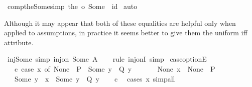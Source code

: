 \begin{isabellebody}
{\isafoldproof}%
%
\isadelimproof
\isanewline
%
\endisadelimproof
\isanewline
{}\isamarkupfalse%
\ comp{\isacharunderscore}{\kern0pt}the{\isacharunderscore}{\kern0pt}Some{\isacharbrackleft}{\kern0pt}simp{\isacharbrackright}{\kern0pt}{\isacharcolon}{\kern0pt}\ {\isachardoublequoteopen}the\ o\ Some\ {\isacharequal}{\kern0pt}\ id{\isachardoublequoteclose}\isanewline
%
\isadelimproof
%
\endisadelimproof
%
\isatagproof
{}\isamarkupfalse%
\ auto%
\endisatagproof
{\isafoldproof}%
%
\isadelimproof
%
\endisadelimproof
%
\begin{isamarkuptext}%
Although it may appear that both of these equalities are helpful
only when applied to assumptions, in practice it seems better to give
them the uniform iff attribute.%
\end{isamarkuptext}\isamarkuptrue%
\isamarkupfalse%
\ inj{\isacharunderscore}{\kern0pt}Some\ {\isacharbrackleft}{\kern0pt}simp{\isacharbrackright}{\kern0pt}{\isacharcolon}{\kern0pt}\ {\isachardoublequoteopen}inj{\isacharunderscore}{\kern0pt}on\ Some\ A{\isachardoublequoteclose}\isanewline
%
\isadelimproof
\ \ %
\endisadelimproof
%
\isatagproof
{}\isamarkupfalse%
\ {\isacharparenleft}{\kern0pt}rule\ inj{\isacharunderscore}{\kern0pt}onI{\isacharparenright}{\kern0pt}\ simp%
\endisatagproof
{\isafoldproof}%
%
\isadelimproof
\isanewline
%
\endisadelimproof
\isanewline
{}\isamarkupfalse%
\ case{\isacharunderscore}{\kern0pt}optionE{\isacharcolon}{\kern0pt}\isanewline
\ \ \ c{\isacharcolon}{\kern0pt}\ {\isachardoublequoteopen}{\isacharparenleft}{\kern0pt}case\ x\ of\ None\ {\isasymRightarrow}\ P\ {\isacharbar}{\kern0pt}\ Some\ y\ {\isasymRightarrow}\ Q\ y{\isacharparenright}{\kern0pt}{\isachardoublequoteclose}\isanewline
\ \ \isanewline
\ \ \ \ {\isacharparenleft}{\kern0pt}None{\isacharparenright}{\kern0pt}\ {\isachardoublequoteopen}x\ {\isacharequal}{\kern0pt}\ None{\isachardoublequoteclose}\ \ P\isanewline
\ \ {\isacharbar}{\kern0pt}\ {\isacharparenleft}{\kern0pt}Some{\isacharparenright}{\kern0pt}\ y\ \ {\isachardoublequoteopen}x\ {\isacharequal}{\kern0pt}\ Some\ y{\isachardoublequoteclose}\ \ {\isachardoublequoteopen}Q\ y{\isachardoublequoteclose}\isanewline
%
\isadelimproof
\ \ %
\endisadelimproof
%
\isatagproof
{}\isamarkupfalse%
\ c\ \isamarkupfalse%
\ {\isacharparenleft}{\kern0pt}cases\ x{\isacharparenright}{\kern0pt}\ simp{\isacharunderscore}{\kern0pt}all%
\endisatagproof
{\isafoldproof}%

\end{isabellebody}
